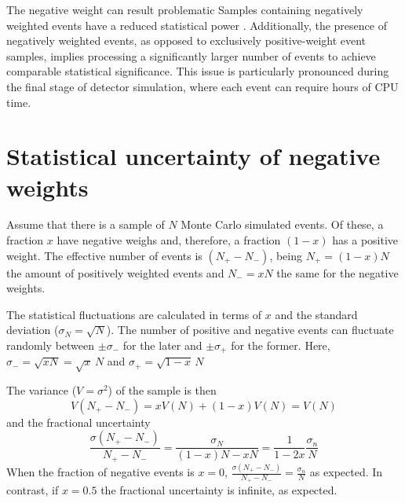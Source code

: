 


The negative weight can result problematic
Samples containing negatively weighted events have a reduced statistical power \cite{Danziger:2021xvr}.
Additionally, the presence of negatively weighted events, as opposed to exclusively positive-weight 
event samples, implies processing a significantly larger number of events to achieve comparable 
statistical significance. This issue is particularly pronounced during the final stage of detector simulation, 
where each event can require hours of CPU time\cite{Andersen:2021mvw}.



\section{Statistical uncertainty of negative weights}
Assume that there is a sample of $N$ Monte Carlo simulated events. Of these,
a fraction $x$ have negative weighs and, therefore, a fraction $(1-x)$ has a positive weight.
The effective number of events is $(N_{+} - N_{-})$, being $N_{+} = (1-x)N$ the amount of
positively weighted events and $N_{-} = xN$ the same for the negative weights.

The statistical fluctuations are calculated in terms of $x$ and the standard deviation 
($\sigma_{N}=\sqrt{N}$). The number of positive and negative events can fluctuate
randomly between $\pm \sigma_{-}$ for the later and  $\pm \sigma_{+}$ for the former.
Here, $\sigma_{-} = \sqrt{xN} = \sqrt{x}\,N$ and $\sigma_{+}= \sqrt{1-x}\,N$

The variance ($V=\sigma^{2}$) of the sample is then
\begin{equation*}%
	V(N_{+} - N_{-}) = xV(N) + (1-x)V(N)= V(N)
\end{equation*}
and the fractional uncertainty
\begin{equation*}%
	\frac{\sigma(N_{+} - N_{-})}{N_{+} - N_{-}} = \frac{\sigma_N}{(1-x)N - xN}
	= \frac{1}{1-2x}\frac{\sigma_n}{N}
\end{equation*}
When the fraction of negative events is $x=0$, $\frac{\sigma(N_{+} - N_{-})}{N_{+} - N_{-}}
= \frac{\sigma_n}{N}$ as expected. In contrast, if $x=0.5$ the fractional uncertainty is infinite,
as expected.


